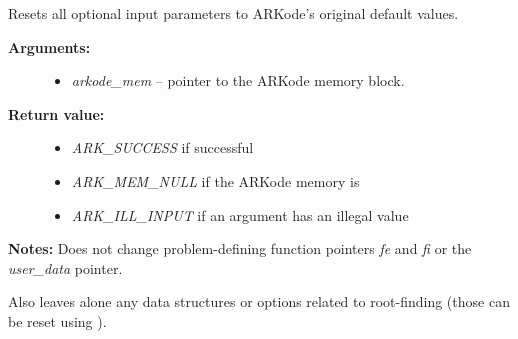 \documentclass[letterpaper,10pt,english]{sphinxmanual}
\begin{document}
\begin{fulllineitems}
\label{c_interface/User_callable:ARKodeSetDefaults}
Resets all optional input parameters to ARKode's original
default values.
\begin{description}
\item[{\textbf{Arguments:}}] \leavevmode\begin{itemize}
\item {} 
\emph{arkode\_mem} -- pointer to the ARKode memory block.

\end{itemize}

\item[{\textbf{Return value:}}] \leavevmode\begin{itemize}
\item {} 
\emph{ARK\_SUCCESS} if successful

\item {} 
\emph{ARK\_MEM\_NULL} if the ARKode memory is 

\item {} 
\emph{ARK\_ILL\_INPUT} if an argument has an illegal value

\end{itemize}

\end{description}

\textbf{Notes:} Does not change problem-defining function pointers \emph{fe}
and \emph{fi} or the \emph{user\_data} pointer.

Also leaves alone any data structures or options related to
root-finding (those can be reset using {\hyperref[c_interface/User_callable:ARKodeRootInit]{}}).

\end{fulllineitems}

\end{document}
